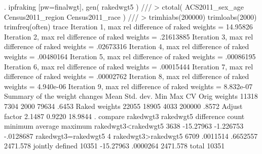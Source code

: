 . ipfraking [pw=finalwgt], gen( rakedwgt5 ) ///
>     ctotal( ACS2011_sex_age Census2011_region Census2011_race ) ///
>     trimhiabs(200000) trimloabs(2000) trimfreq(often) trace
{\smallskip}
 Iteration 1, max rel difference of raked weights = 14.95826
 Iteration 2, max rel difference of raked weights = .21613885
 Iteration 3, max rel difference of raked weights = .02673316
 Iteration 4, max rel difference of raked weights = .00480164
 Iteration 5, max rel difference of raked weights = .00086195
 Iteration 6, max rel difference of raked weights = .00015444
 Iteration 7, max rel difference of raked weights = .00002762
 Iteration 8, max rel difference of raked weights = 4.940e-06
 Iteration 9, max rel difference of raked weights = 8.832e-07
{\smallskip}
   Summary of the weight changes
{\smallskip}
              {\VBAR}    Mean    Std. dev.    Min        Max       CV
Orig weights  {\VBAR}    11318       7304      2000       79634   .6453
Raked weights {\VBAR}    22055      18905      4033      200000   .8572
Adjust factor {\VBAR}   2.1487               0.9220     18.9844
{\smallskip}
. compare rakedwgt3 rakedwgt5
{\smallskip}
                                         difference 
                            count       minimum      average     maximum
rakedwgt3<rakedwgt5          3638     -15.27963    -1.226753   -.0128687
rakedwgt3=rakedwgt5             4
rakedwgt3>rakedwgt5          6709      .0011514     .6652557    2471.578
jointly defined             10351     -15.27963     .0000264    2471.578
total                       10351
{\smallskip}
